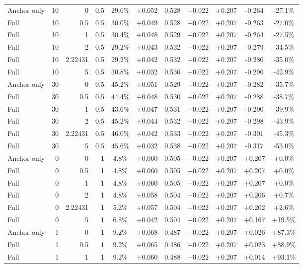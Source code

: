 \begin{table}[htbp]
\begin{tabular}{lrrrccccccc}
Anchor only & 10 & 0 & 0.5 & 29.6\% & +0.052 & 0.528 & +0.022 & +0.207 & -0.264 & -27.1\% \\
Full & 10 & 0.5 & 0.5 & 30.0\% & +0.049 & 0.528 & +0.022 & +0.207 & -0.263 & -27.0\% \\
Full & 10 & 1 & 0.5 & 30.4\% & +0.048 & 0.529 & +0.022 & +0.207 & -0.264 & -27.5\% \\
Full & 10 & 2 & 0.5 & 29.2\% & +0.043 & 0.532 & +0.022 & +0.207 & -0.279 & -34.5\% \\
Full & 10 & 2.22431 & 0.5 & 29.2\% & +0.042 & 0.532 & +0.022 & +0.207 & -0.280 & -35.0\% \\
Full & 10 & 5 & 0.5 & 30.8\% & +0.032 & 0.536 & +0.022 & +0.207 & -0.296 & -42.9\% \\
Anchor only & 30 & 0 & 0.5 & 45.2\% & +0.051 & 0.529 & +0.022 & +0.207 & -0.282 & -35.7\% \\
Full & 30 & 0.5 & 0.5 & 44.4\% & +0.048 & 0.530 & +0.022 & +0.207 & -0.288 & -38.7\% \\
Full & 30 & 1 & 0.5 & 43.6\% & +0.047 & 0.531 & +0.022 & +0.207 & -0.290 & -39.9\% \\
Full & 30 & 2 & 0.5 & 45.2\% & +0.044 & 0.532 & +0.022 & +0.207 & -0.298 & -43.9\% \\
Full & 30 & 2.22431 & 0.5 & 46.0\% & +0.042 & 0.533 & +0.022 & +0.207 & -0.301 & -45.3\% \\
Full & 30 & 5 & 0.5 & 45.6\% & +0.032 & 0.538 & +0.022 & +0.207 & -0.317 & -53.0\% \\
Anchor only & 0 & 0 & 1 & 4.8\% & +0.060 & 0.505 & +0.022 & +0.207 & +0.207 & +0.0\% \\
Full & 0 & 0.5 & 1 & 4.8\% & +0.060 & 0.505 & +0.022 & +0.207 & +0.207 & +0.0\% \\
Full & 0 & 1 & 1 & 4.8\% & +0.060 & 0.505 & +0.022 & +0.207 & +0.207 & +0.0\% \\
Full & 0 & 2 & 1 & 4.8\% & +0.058 & 0.504 & +0.022 & +0.207 & +0.206 & +0.7\% \\
Full & 0 & 2.22431 & 1 & 5.2\% & +0.057 & 0.504 & +0.022 & +0.207 & +0.202 & +2.6\% \\
Full & 0 & 5 & 1 & 6.8\% & +0.042 & 0.504 & +0.022 & +0.207 & +0.167 & +19.5\% \\
Anchor only & 1 & 0 & 1 & 9.2\% & +0.068 & 0.487 & +0.022 & +0.207 & +0.026 & +87.3\% \\
Full & 1 & 0.5 & 1 & 9.2\% & +0.065 & 0.486 & +0.022 & +0.207 & +0.023 & +88.9\% \\
Full & 1 & 1 & 1 & 9.2\% & +0.060 & 0.488 & +0.022 & +0.207 & +0.014 & +93.1\% \\

\end{tabular}
\end{table}
